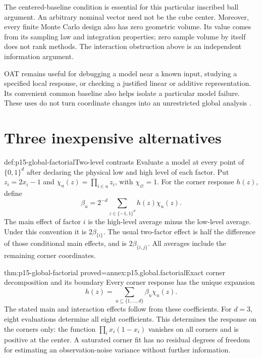 The centered-baseline condition is essential for this particular inscribed
ball argument. An arbitrary nominal vector need not be the cube center.
Moreover, every finite Monte Carlo design also has zero geometric volume.
Its value comes from its sampling law and integration properties;
zero sample volume by itself does not rank methods.
The interaction obstruction above is an independent information argument.

OAT remains useful for debugging a model near a known input, studying a
specified local response, or checking a justified linear or additive
representation. Its convenient common baseline also helps isolate a
particular model failure. These uses do not turn coordinate changes into
an unrestricted global analysis
\cite[Sections 2--4]{SaltelliAnnoni2010Sensitivity}.

\section{Three inexpensive alternatives}

\begin{hbdefinition}{def:p15-global-factorial}{Two-level contrasts}
Evaluate a model at every point of \(\{0,1\}^d\) after declaring the
physical low and high level of each factor. Put \(z_i=2x_i-1\) and
\(\chi_u(z)=\prod_{i\in u}z_i\), with \(\chi_\varnothing=1\).
For the corner response \(h(z)\), define
\[
 \beta_u=2^{-d}\sum_{z\in\{-1,1\}^d}h(z)\chi_u(z).
\]
The main effect of factor \(i\) is the high-level average minus the
low-level average. Under this convention it is \(2\beta_{\{i\}}\).
The usual two-factor effect is half the difference of those conditional
main effects, and is \(2\beta_{\{i,j\}}\).
All averages include the remaining corner coordinates.
\end{hbdefinition}

\begin{hbtheorem}{thm:p15-global-factorial}
 {proved=annex:p15.global.factorial}{Exact corner decomposition and its boundary}
Every corner response has the unique expansion
\[
 h(z)=\sum_{u\subseteq\{1,\ldots,d\}}\beta_u\chi_u(z).
\]
The stated main and interaction effects follow from these coefficients.
For \(d=3\), eight evaluations determine all eight coefficients.
This determines the response on the corners only: the function
\(\prod_i x_i(1-x_i)\) vanishes on all corners and is positive at the
center. A saturated corner fit has no residual degrees of freedom for
estimating an observation-noise variance without further information.
\end{hbtheorem}

